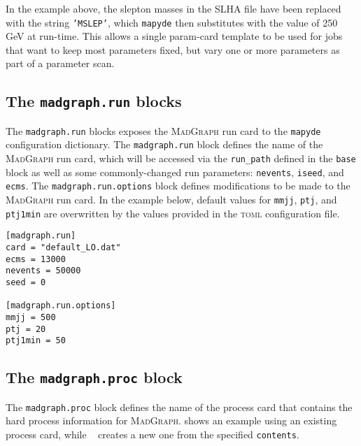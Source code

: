 \documentclass{article}
\newcommand{\mapyde}{\texttt{mapyde}}
\newcommand{\madgraph}{\textsc{MadGraph}}
\newcommand{\toml}{\textsc{toml}}
\begin{document}
In the example above, the slepton masses in the SLHA file have been replaced with the string \texttt{'{{MSLEP}}'}, which \mapyde{} then substitutes with the value of 250 GeV at run-time.  This allows a single param-card template to be used for jobs that want to keep most parameters fixed, but vary one or more parameters as part of a parameter scan.

\subsection{The \texttt{madgraph.run} blocks}
\label{ssec:the-madgraph-run-blocks}

The \texttt{madgraph.run} blocks exposes the \madgraph{} run card to the \mapyde{} configuration dictionary.  The \texttt{madgraph.run} block defines the name of the \madgraph{} run card, which will be accessed via the \texttt{run\_path} defined in the \texttt{base} block as well as some commonly-changed run parameters: \texttt{nevents}, \texttt{iseed}, and \texttt{ecms}.  The \texttt{madgraph.run.options} block defines modifications to be made to the \madgraph{} run card.  In the example below, default values for \texttt{mmjj}, \texttt{ptj}, and \texttt{ptj1min} are overwritten by the values provided in the \toml{} configuration file.

\begin{listing}[H]
	\begin{verbatim}
[madgraph.run]
card = "default_LO.dat"
ecms = 13000
nevents = 50000
seed = 0

[madgraph.run.options]
mmjj = 500
ptj = 20
ptj1min = 50
        \end{verbatim}
	\caption{The \texttt{madgraph.run} blocks of an example \toml{} configuration file for generating slepton events.}
	\label{slepton-config-run}
\end{listing}


\subsection{The \texttt{madgraph.proc} block}
\label{ssec:the-madgraph-proc-block}

The \texttt{madgraph.proc} block defines the name of the process card that contains the hard process information for \madgraph.  shows an example using an existing process card, while ~ creates a new one from the specified \texttt{contents}.
\end{document}

